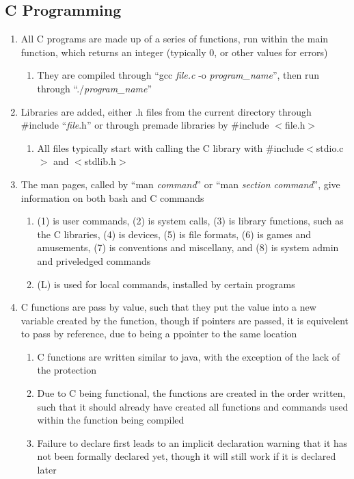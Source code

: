 \documentclass[11 pt, twoside]{article}
\begin{document}
\subsection{C Programming}
\begin{enumerate}
\item All C programs are made up of a series of functions, run within the main function, which returns an integer (typically 0, or other values for errors)
\begin{enumerate}
\item They are compiled through ``gcc \textit{file.c} -o \textit{program\_name}'', then run through ``./\textit{program\_name}''
\end{enumerate}
\item Libraries are added, either .h files from the current directory through \#include ``\textit{file}.h'' or through premade libraries by \#include $<$file.h$>$
\begin{enumerate}
\item All files typically start with calling the C library with \#include$<$stdio.c$>$ and $<$stdlib.h$>$
\end{enumerate}
\item The man pages, called by ``man \textit{command}'' or ``man \textit{section command}'', give information on both bash and C commands
\begin{enumerate}
\item (1) is user commands, (2) is system calls, (3) is library functions, such as the C libraries, (4) is devices, (5) is file formats, (6) is games and amusements, (7) is conventions and miscellany, and (8) is system admin and priveledged commands
\item (L) is used for local commands, installed by certain programs
\end{enumerate}
\item C functions are pass by value, such that they put the value into a new variable created by the function, though if pointers are passed, it is equivelent to pass by reference, due to being a ppointer to the same location
\begin{enumerate}
\item C functions are written similar to java, with the exception of the lack of the protection
\item Due to C being functional, the functions are created in the order written, such that it should already have created all functions and commands used within the function being compiled
\item Failure to declare first leads to an implicit declaration warning that it has not been formally declared yet, though it will still work if it is declared later
\end{enumerate}
\end{enumerate}
\end{document}
